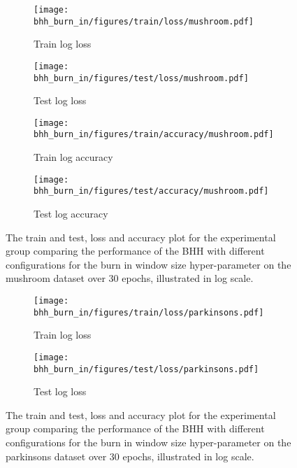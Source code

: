 \begin{figure}[htbp]
	\begin{subfigure}{0.5\textwidth}
		\centering
		\texttt{[image: bhh\_burn\_in/figures/train/loss/mushroom.pdf]}
		\caption{Train log loss}
		\label{fig:results:burn_in:figures:loss:train:mushroom}
	\end{subfigure}
	\begin{subfigure}{0.5\textwidth}
		\centering
		\texttt{[image: bhh\_burn\_in/figures/test/loss/mushroom.pdf]}
		\caption{Test log loss}
		\label{fig:results:burn_in:figures:loss:test:mushroom}
	\end{subfigure}
	\par\bigskip
	\begin{subfigure}{0.5\textwidth}
		\centering
		\texttt{[image: bhh\_burn\_in/figures/train/accuracy/mushroom.pdf]}
		\caption{Train log accuracy}
		\label{fig:results:burn_in:figures:accuracy:train:mushroom}
	\end{subfigure}
	\begin{subfigure}{0.5\textwidth}
		\centering
		\texttt{[image: bhh\_burn\_in/figures/test/accuracy/mushroom.pdf]}
		\caption{Test log accuracy}
		\label{fig:results:burn_in:figures:accuracy:test:mushroom}
	\end{subfigure}
	\par\bigskip
	\caption{The train and test, loss and accuracy plot for the experimental group comparing the performance of the \acs{BHH} with different configurations for the burn in window size hyper-parameter on the mushroom dataset over 30 epochs, illustrated in log scale.}
	\label{fig:results:burn_in:figures:mushroom}
\end{figure}



\begin{figure}[htbp]
	\begin{subfigure}{0.5\textwidth}
		\centering
		\texttt{[image: bhh\_burn\_in/figures/train/loss/parkinsons.pdf]}
		\caption{Train log loss}
		\label{fig:results:burn_in:figures:loss:train:parkinsons}
	\end{subfigure}
	\begin{subfigure}{0.5\textwidth}
		\centering
		\texttt{[image: bhh\_burn\_in/figures/test/loss/parkinsons.pdf]}
		\caption{Test log loss}
		\label{fig:results:burn_in:figures:loss:test:parkinsons}
	\end{subfigure}
	\par\bigskip
	\caption{The train and test, loss and accuracy plot for the experimental group comparing the performance of the \acs{BHH} with different configurations for the burn in window size hyper-parameter on the parkinsons dataset over 30 epochs, illustrated in log scale.}
	\label{fig:results:burn_in:figures:parkinsons}
\end{figure}

